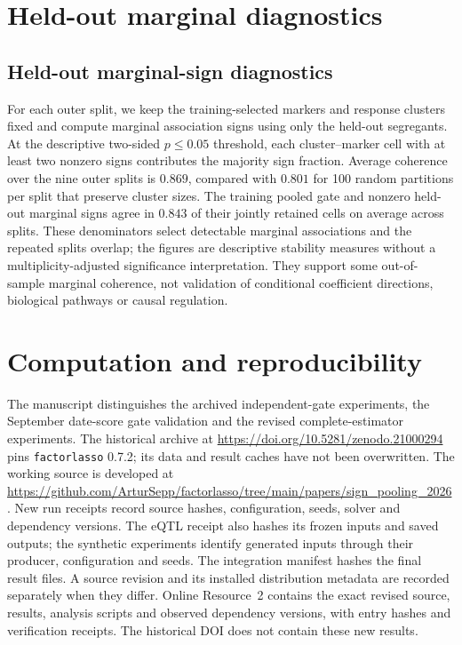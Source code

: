 \documentclass[11pt,a4paper]{article}
\begin{document}
\FloatBarrier

\section{Held-out marginal diagnostics}\label{app:eqtl-heldout}
\subsection{Held-out marginal-sign diagnostics}\label{sec:eqtl-heldout}

For each outer split, we keep the training-selected markers and response
clusters fixed and compute marginal association signs using only the held-out
segregants. At the descriptive two-sided $p\leq0.05$ threshold, each
cluster--marker cell with at least two nonzero signs contributes the majority
sign fraction. Average coherence over the nine outer splits is $0.869$,
compared with $0.801$ for 100 random partitions per split that preserve
cluster sizes. The training pooled gate and nonzero held-out marginal signs
agree in $0.843$ of their jointly retained cells on average across splits.
These denominators select detectable marginal associations and the repeated
splits overlap; the figures are descriptive stability measures without a
multiplicity-adjusted significance interpretation. They support some
out-of-sample marginal coherence, not validation of conditional coefficient
directions, biological pathways or causal regulation.


\section{Computation and reproducibility} \label{app:computation}

The manuscript distinguishes the archived independent-gate experiments, the
September date-score gate validation and the revised complete-estimator
experiments. The historical archive at
\url{https://doi.org/10.5281/zenodo.21000294} pins \texttt{factorlasso} 0.7.2;
its data and result caches have not been overwritten. The working source is
developed at
\url{https://github.com/ArturSepp/factorlasso/tree/main/papers/sign_pooling_2026}.
New run receipts record source hashes, configuration, seeds, solver and
dependency versions. The eQTL receipt also hashes its frozen inputs and saved
outputs; the synthetic experiments identify generated inputs through their
producer, configuration and seeds. The integration manifest hashes the final
result files. A source revision and its installed
distribution metadata are recorded separately when they differ.
Online Resource~2 contains the exact revised source, results, analysis scripts
and observed dependency versions, with entry hashes and verification receipts.
The historical DOI does not contain these new results.
\end{document}
